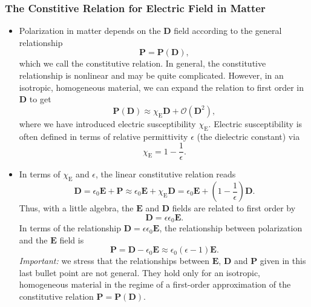 \documentclass[11pt, a4paper]{article}
\renewcommand{\vec}[1]{\bm{#1}} %
\newcommand{\E}{\vec{E}} %
\newcommand{\D}{\vec{D}}  %
\renewcommand{\P}{\vec{P}}  %
\newcommand{\ee}{\epsilon_{0}}  %
\begin{document}
\subsubsection{The Constitive Relation for Electric Field in Matter}
\begin{itemize}
	\item Polarization in matter depends on the $ \D $ field according to the general relationship
	\begin{equation*}
		\P = \P(\D),
	\end{equation*}
	which we call the constitutive relation. In general, the constitutive relationship is nonlinear and may be quite complicated. However, in an isotropic, homogeneous material, we can expand the relation to first order in $ \D $ to get
	\begin{equation*}
		\P(\D) \approx \chi_{\text{E}} \D + \mathcal{O}(\D^{2}),
	\end{equation*}
    where we have introduced electric susceptibility $ \chi_{\text{E}} $. Electric susceptibility is often defined in terms of relative permittivity $ \epsilon $ (the dielectric constant) via
	\begin{equation*}
        \chi_{\text{E}} = 1 - \frac{1}{\epsilon}.
	\end{equation*}
	
	\item In terms of $ \chi_{\text{E}} $ and $ \epsilon $, the linear constitutive relation reads
	\begin{equation*}
        \D = \ee \E + \P \approx \ee \E + \chi_{\text{E}} \D = \ee \E + \left( 1 - \frac{1}{\epsilon} \right) \D.
	\end{equation*}
	Thus, with a little algebra, the $ \E $ and $ \D $ fields are related to first order by
	\begin{equation*}
        \D = \epsilon \ee \E.
	\end{equation*}
    In terms of the relationship $ \D = \epsilon \ee \E $, the relationship between polarization and the $ \E $ field is
	\begin{equation*}
        \P = \D - \ee \E \approx \ee (\epsilon - 1)\E.
	\end{equation*}
    \textit{Important:} we stress that the relationships between $ \E $, $ \D $ and $ \P $ given in this last bullet point are not general. They hold only for an isotropic, homogeneous material in the regime of a first-order approximation of the constitutive relation $ \P = \P(\D) $.
	
\end{itemize}
\end{document}
